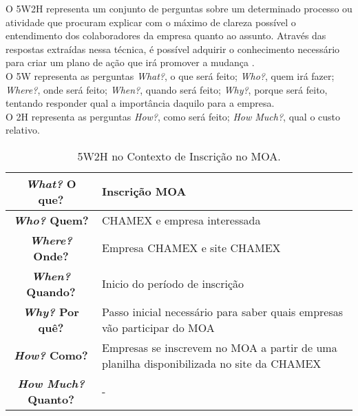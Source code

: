 O 5W2H representa um conjunto de perguntas sobre um determinado processo ou atividade que procuram explicar com o máximo de clareza possível o entendimento dos colaboradores da empresa quanto ao assunto. Através das respostas extraídas nessa técnica, é possível adquirir o conhecimento necessário para criar um plano de ação que irá promover a mudança \cite{paim}.
\\ \indent O 5W representa as perguntas \emph{What?}, o que será feito; \emph{Who?}, quem irá fazer; \emph{Where?}, onde será feito; \emph{When?}, quando será feito; \emph{Why?}, porque será feito, tentando responder qual a importância daquilo para a empresa.
\\ \indent O 2H representa as perguntas \emph{How?}, como será feito; \emph{How Much?}, qual o custo relativo.

\begin{table}[H]
	\centering
	\begin{tabular}{|c|p{10cm}|}
		\hline
		\textbf{\emph{What?} O que?} & Inscrição MOA \\ \hline
		\textbf{\emph{Who?} Quem?} & CHAMEX e empresa interessada \\ \hline
		\textbf{\emph{Where?} Onde?} & Empresa CHAMEX e site CHAMEX \\ \hline
		\textbf{\emph{When?} Quando?} & Inicio do período de inscrição \\ \hline
		\textbf{\emph{Why?} Por quê?} & Passo inicial necessário para saber quais empresas vão participar do MOA \\ \hline
		\textbf{\emph{How?} Como?} & Empresas se inscrevem no MOA a partir de uma planilha disponibilizada no site da CHAMEX \\ \hline
		\textbf{\emph{How Much?} Quanto?} & - \\ \hline
	\end{tabular}
	\label{tab:5w2h}
	\caption[5W2H no Contexto de Inscrição no MOA]{5W2H no Contexto de Inscrição no MOA.}
\end{table}